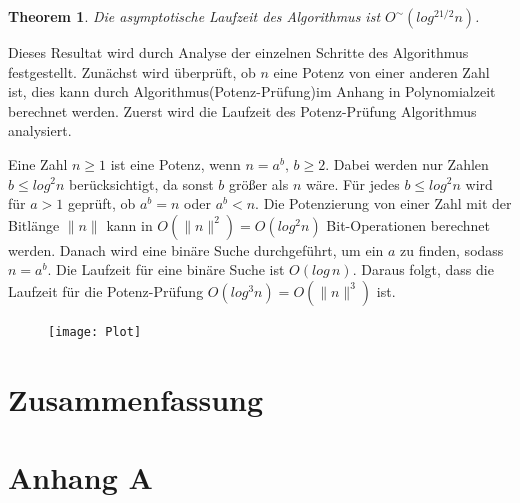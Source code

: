 \documentclass[12pt,oneside]{article}
\newtheorem{theorem}{Theorem}[section]
\theoremstyle{remark}
\theoremstyle{definition}
\begin{document}
\begin{theorem}
Die asymptotische Laufzeit des Algorithmus ist $O^{\sim}(log^{21/2}n)$. 
\end{theorem}


Dieses Resultat wird durch Analyse der einzelnen Schritte des Algorithmus festgestellt. Zunächst wird überprüft, ob $n$ eine Potenz von einer anderen Zahl ist, dies kann durch Algorithmus(Potenz-Prüfung)im Anhang in Polynomialzeit berechnet werden. Zuerst wird die Laufzeit des Potenz-Prüfung Algorithmus analysiert.

Eine Zahl $n \geq 1$ ist eine Potenz, wenn $ n  = a^b, \, b \geq 2$. Dabei werden nur Zahlen $b \leq log^2 n$ berücksichtigt, da sonst $b$ größer als $n$ wäre. Für jedes $b \leq log^2 n$ wird für $a > 1$ geprüft, ob $a^b = n$ oder $a^b < n$. Die Potenzierung von einer Zahl mit der Bitlänge $\lVert n \lVert$ kann in $O(\lVert n \rVert^2) = O(log^2 n)$ Bit-Operationen berechnet werden.%
Danach wird eine binäre Suche durchgeführt, um ein $a$ zu finden, sodass $ n = a^b$. Die Laufzeit für eine binäre Suche ist $O(log \, n)$. Daraus folgt, dass die Laufzeit für die Potenz-Prüfung $O(log^3 n) = O(\lVert n \rVert^3)$ ist.

\begin{figure}[h]
\texttt{[image: Plot]}
\end{figure}



\section{Zusammenfassung}


\clearpage
\lhead{}
\printbibliography
{}


\clearpage
\appendix
\section{Anhang A}
\end{document}
